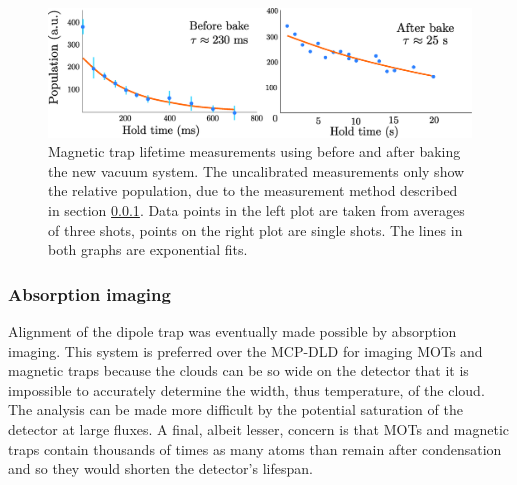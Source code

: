 	\begin{figure}
		\includegraphics[width=\textwidth]{fig/lattice/trap_lifetimes}
		\caption{Magnetic trap lifetime measurements using before and after baking the new vacuum system. 
		The uncalibrated measurements only show the relative population, due to the measurement method described in section \ref{sec:abs_img}.
		Data points in the left plot are taken from averages of three shots, points on the right plot are single shots.
		The lines in both graphs are exponential fits.}
		\label{fig:lifetime}
	\end{figure}


\subsubsection{Absorption imaging}
\label{sec:abs_img}
		
	Alignment of the dipole trap was eventually made possible by absorption imaging.
	This system is preferred over the MCP-DLD for imaging MOTs and magnetic traps because 
	the clouds can be so wide on the detector that it is impossible to accurately determine the width, thus temperature, of the cloud.
	The analysis can be made more difficult by the potential saturation of the detector at large fluxes.
	A final, albeit lesser, concern is that MOTs and magnetic traps contain thousands of times as many atoms than remain after condensation and so they would shorten the detector's lifespan.
	


